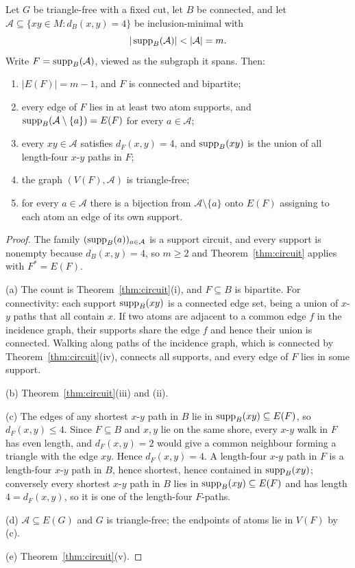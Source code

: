 \begin{corollary}\label{cor:graph}
Let \(G\) be triangle-free with a fixed cut, let \(B\) be connected,
and let \(\mathcal A\subseteq\{xy\in M:d_B(x,y)=4\}\) be
inclusion-minimal with
\[
 |\supp_B(\mathcal A)|<|\mathcal A|=m.
\]
Write \(F=\operatorname{supp}_B(\mathcal A)\), viewed as the subgraph it spans. Then:
\begin{enumerate}[label=\textup{(\alph*)}]
\item \(|E(F)|=m-1\), and \(F\) is connected and bipartite;
\item every edge of \(F\) lies in at least two atom supports, and
\(\operatorname{supp}_B(\mathcal A\setminus\{a\})=E(F)\) for every
\(a\in\mathcal A\);
\item every \(xy\in\mathcal A\) satisfies \(d_F(x,y)=4\), and
\(\operatorname{supp}_B(xy)\) is the union of all length-four \(x\)-\(y\) paths in
\(F\);
\item the graph \((V(F),\mathcal A)\) is triangle-free;
\item for every \(a\in\mathcal A\) there is a bijection from
\(\mathcal A\setminus\{a\}\) onto \(E(F)\) assigning to each atom an
edge of its own support.
\end{enumerate}
\end{corollary}

\begin{proof}
The family \((\operatorname{supp}_B(a))_{a\in\mathcal A}\) is a support circuit, and
every support is nonempty because \(d_B(x,y)=4\), so \(m\ge2\) and
Theorem~\ref{thm:circuit} applies with \(F^{*}=E(F)\).

(a) The count is Theorem~\ref{thm:circuit}(i), and \(F\subseteq B\) is
bipartite. For connectivity: each support \(\operatorname{supp}_B(xy)\) is a
connected edge set, being a union of \(x\)-\(y\) paths that all contain
\(x\). If two atoms are adjacent to a common edge \(f\) in the
incidence graph, their supports share the edge \(f\) and hence their
union is connected. Walking along paths of the incidence graph, which
is connected by Theorem~\ref{thm:circuit}(iv), connects all supports,
and every edge of \(F\) lies in some support.

(b) Theorem~\ref{thm:circuit}(iii) and (ii).

(c) The edges of any shortest \(x\)-\(y\) path in \(B\) lie in
\(\operatorname{supp}_B(xy)\subseteq E(F)\), so \(d_F(x,y)\le4\). Since
\(F\subseteq B\) and \(x,y\) lie on the same shore, every \(x\)-\(y\)
walk in \(F\) has even length, and \(d_F(x,y)=2\) would give a common
neighbour forming a triangle with the edge \(xy\). Hence
\(d_F(x,y)=4\). A length-four \(x\)-\(y\) path in \(F\) is a
length-four \(x\)-\(y\) path in \(B\), hence shortest, hence contained
in \(\operatorname{supp}_B(xy)\); conversely every shortest \(x\)-\(y\) path in \(B\)
lies in \(\operatorname{supp}_B(xy)\subseteq E(F)\) and has length
\(4=d_F(x,y)\), so it is one of the length-four \(F\)-paths.

(d) \(\mathcal A\subseteq E(G)\) and \(G\) is triangle-free; the
endpoints of atoms lie in \(V(F)\) by (c).

(e) Theorem~\ref{thm:circuit}(v).
\end{proof}

